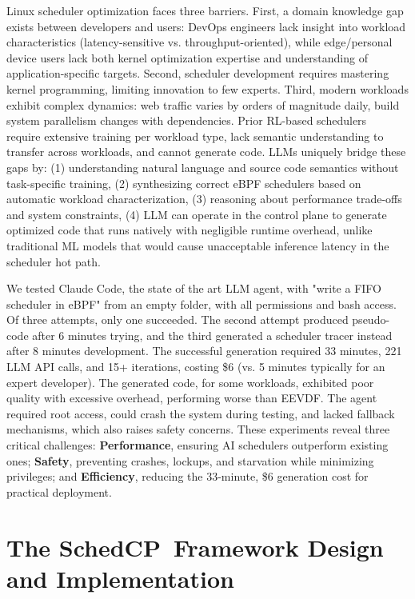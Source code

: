 \documentclass[preprint]{article}
\newcommand{\sys}{SchedCP\xspace}
\begin{document}
Linux scheduler optimization faces three barriers. First, a domain knowledge gap exists between developers and users: DevOps engineers lack insight into workload characteristics (latency-sensitive vs. throughput-oriented), while edge/personal device users lack both kernel optimization expertise and understanding of application-specific targets. Second, scheduler development requires mastering kernel programming, limiting innovation to few experts. Third, modern workloads exhibit complex dynamics: web traffic varies by orders of magnitude daily, build system parallelism changes with dependencies. Prior RL-based schedulers~\cite{mao2019decima,qiu2020firm,zhang2024mrsch,mao2019park} require extensive training per workload type, lack semantic understanding to transfer across workloads, and cannot generate code. LLMs uniquely bridge these gaps by: (1) understanding natural language and source code semantics without task-specific training, (2) synthesizing correct eBPF schedulers based on automatic workload characterization, (3) reasoning about performance trade-offs and system constraints, (4) LLM can operate in the control plane to generate optimized code that runs natively with negligible runtime overhead, unlike traditional ML models that would cause unacceptable inference latency in the scheduler hot path.

We tested Claude Code\cite{claudecode}, the state of the art LLM agent, with "write a FIFO scheduler in eBPF" from an empty folder, with all permissions and bash access. Of three attempts, only one succeeded. The second attempt produced pseudo-code after 6 minutes trying, and the third generated a scheduler tracer instead after 8 minutes development. The successful generation required 33 minutes, 221 LLM API calls, and 15+ iterations, costing \$6 (vs. 5 minutes typically for an expert developer). The generated code, for some workloads, exhibited poor quality with excessive overhead, performing worse than EEVDF. The agent required root access, could crash the system during testing, and lacked fallback mechanisms, which also raises safety concerns. These experiments reveal three critical challenges: \textbf{Performance}, ensuring AI schedulers outperform existing ones; \textbf{Safety}, preventing crashes, lockups, and starvation while minimizing privileges; and \textbf{Efficiency}, reducing the 33-minute, \$6 generation cost for practical deployment.

\section{The \sys\ Framework Design and Implementation}
\label{sec:schedcp_framework}
\end{document}
